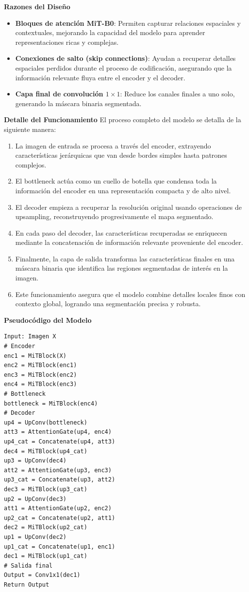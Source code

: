 \textbf{Razones del Diseño}
\begin{itemize}
    \item \textbf{Bloques de atención MiT-B0}: 
    Permiten capturar relaciones espaciales y contextuales, mejorando la capacidad del modelo para aprender representaciones ricas y complejas.
    
    \item \textbf{Conexiones de salto (skip connections)}: 
    Ayudan a recuperar detalles espaciales perdidos durante el proceso de codificación, asegurando que la información relevante fluya entre el encoder y el decoder.
    
    \item \textbf{Capa final de convolución $1\times1$}: 
    Reduce los canales finales a uno solo, generando la máscara binaria segmentada.
    \end{itemize}
\textbf{Detalle del Funcionamiento}
El proceso completo del modelo se detalla de la siguiente manera:
\begin{enumerate}
    \item La imagen de entrada se procesa a través del encoder, extrayendo características jerárquicas que van desde bordes simples hasta patrones complejos.
    \item El bottleneck actúa como un cuello de botella que condensa toda la información del encoder en una representación compacta y de alto nivel.
    \item El decoder empieza a recuperar la resolución original usando operaciones de upsampling, reconstruyendo progresivamente el mapa segmentado.
    \item En cada paso del decoder, las características recuperadas se enriquecen mediante la concatenación de información relevante proveniente del encoder.
    \item Finalmente, la capa de salida transforma las características finales en una máscara binaria que identifica las regiones segmentadas de interés en la imagen.
    \item Este funcionamiento asegura que el modelo combine detalles locales finos con contexto global, logrando una segmentación precisa y robusta.
\end{enumerate}
\textbf{Pseudocódigo del Modelo}
\begin{verbatim}
Input: Imagen X
# Encoder
enc1 = MiTBlock(X)
enc2 = MiTBlock(enc1)
enc3 = MiTBlock(enc2)
enc4 = MiTBlock(enc3)
# Bottleneck
bottleneck = MiTBlock(enc4)
# Decoder
up4 = UpConv(bottleneck)
att3 = AttentionGate(up4, enc4)
up4_cat = Concatenate(up4, att3)
dec4 = MiTBlock(up4_cat)
up3 = UpConv(dec4)
att2 = AttentionGate(up3, enc3)
up3_cat = Concatenate(up3, att2)
dec3 = MiTBlock(up3_cat)
up2 = UpConv(dec3)
att1 = AttentionGate(up2, enc2)
up2_cat = Concatenate(up2, att1)
dec2 = MiTBlock(up2_cat)
up1 = UpConv(dec2)
up1_cat = Concatenate(up1, enc1)
dec1 = MiTBlock(up1_cat)
# Salida final
Output = Conv1x1(dec1)
Return Output
\end{verbatim}

